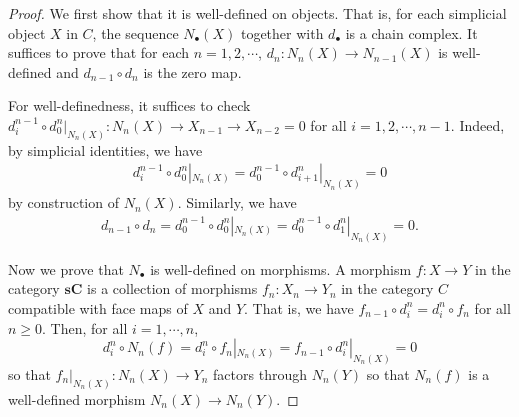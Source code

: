 \documentclass{article}
\begin{document}
\begin{proof}
    We first show that it is well-defined on objects. That is, for each simplicial object $X$ in $C$, the sequence $N_\bullet(X)$ together with $d_\bullet$ is a chain complex. It suffices to prove that for each $n=1,2,\cdots$, $d_n:N_n(X) \to N_{n-1}(X)$ is well-defined and $d_{n-1} \circ d_n$ is the zero map.

    For well-definedness, it suffices to check $d_i^{n-1} \circ d_0^n|_{N_n(X)} : N_n(X) \to X_{n-1} \to X_{n-2}=0$ for all $i=1,2,\cdots,n-1$. Indeed, by simplicial identities, we have
    \begin{align*}
        d_i^{n-1} \circ d_0^n|_{N_n(X)} = d_0^{n-1} \circ d_{i+1}^n|_{N_n(X)} = 0 
    \end{align*}
    by construction of $N_n(X)$. Similarly, we have
    \begin{align*}
        d_{n-1} \circ d_n = d_0^{n-1} \circ d_0^n|_{N_n(X)} = d_0^{n-1} \circ d_1^n|_{N_n(X)} = 0.
    \end{align*}

    Now we prove that $N_\bullet$ is well-defined on morphisms. A morphism $f:X \to Y$ in the category $\mathbf{sC}$ is a collection of morphisms $f_n:X_n \to Y_n$ in the category $C$ compatible with face maps of $X$ and $Y$. That is, we have $f_{n-1} \circ d_i^n = d_i^n \circ f_n$ for all $n \ge 0$. Then, for all $i=1,\cdots,n$,
    \[
    d_i^n \circ N_n(f) = d_i^n \circ f_n|_{N_n(X)} = f_{n-1} \circ d_i^n |_{N_n(X)} = 0
    \]
    so that $f_n|_{N_n(X)}: N_n(X) \to Y_n$ factors through $N_n(Y)$ so that $N_n(f)$ is a well-defined morphism $N_n(X) \to N_n(Y)$.
\end{proof}
\end{document}
